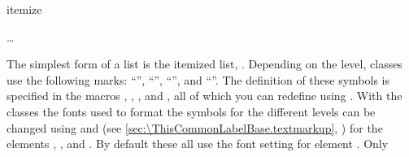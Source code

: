   \begin{Declaration}
    \begin{Environment}{itemize}
      \begin{Body}
         \dots
        \BodyDots
      \end{Body}
    \end{Environment}
  \end{Declaration}%
  The simplest form of a list is the itemized list,
  . %
  \iffalse %
  The users of a certain disliked word processing package often refer to this
  form of a list as \emph{bullet points}. Presumably, they cannot imagine
  that, depending on the level, a symbol other than a large dot could be used
  to introduce each point. %
  \fi%
  Depending on the level, \KOMAScript{} classes use the following marks:
  ``{}'', ``{}'', ``{}'', and
  ``{}''. The definition of these symbols is specified in the
  macros , , , and
  , all of which you can redefine using
  .
  With the \KOMAScript{} classes the
  fonts used to format the symbols for the
  different levels can be changed using
   and
   (see
  \autoref{sec:\ThisCommonLabelBase.textmarkup},
  ) for the elements
  ,
  ,
   and
  . By default
  these all use the font setting for element
  . Only
